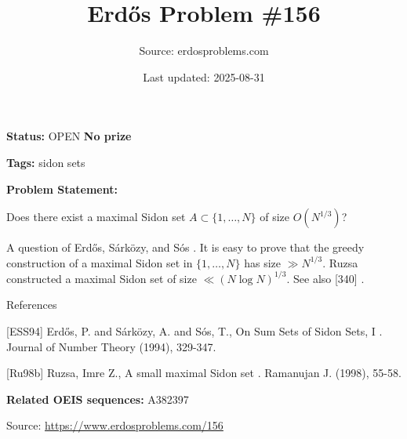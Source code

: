 \documentclass{article}
\title{Erd\H{o}s Problem \#156}
\date{Last updated: 2025-08-31}
\author{Source: erdosproblems.com}
\begin{document}
\maketitle

\noindent\textbf{Status:} OPEN \quad \textbf{No prize}

\noindent\textbf{Tags:} sidon sets

\medskip

\noindent\textbf{Problem Statement:}

Does there exist a maximal Sidon set $A\subset \{1,\ldots,N\}$ of size $O(N^{1/3})$?




A question of Erd\H{o}s, S\'{a}rk\"{o}zy, and S\'{o}s \cite{ESS94}. It is easy to prove that the greedy construction of a maximal Sidon set in $\{1,\ldots,N\}$ has size $\gg N^{1/3}$. Ruzsa \cite{Ru98b} constructed a maximal Sidon set of size $\ll (N\log N)^{1/3}$. See also [340] .




References

[ESS94] Erd\H{o}s, P. and S\'{a}rk\"{o}zy, A. and S\'{o}s, T., On Sum Sets of Sidon Sets, I . Journal of Number Theory (1994), 329-347.

[Ru98b] Ruzsa, Imre Z., A small maximal Sidon set . Ramanujan J. (1998), 55-58.

\noindent\textbf{Related OEIS sequences:} A382397


\bigskip
\noindent\small{Source: \url{https://www.erdosproblems.com/156}}
\end{document}
